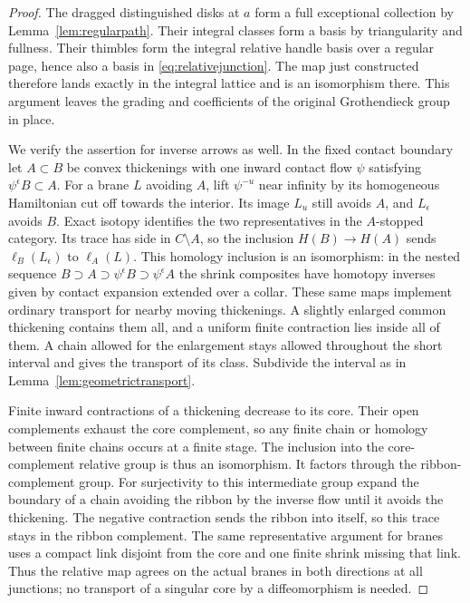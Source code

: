 \begin{proof}
The dragged distinguished disks at $a$ form a full exceptional collection by Lemma~\ref{lem:regularpath}. Their integral classes form a basis by triangularity and fullness. Their thimbles form the integral relative handle basis over a regular page, hence also a basis in \eqref{eq:relativejunction}. The map just constructed therefore lands exactly in the integral lattice and is an isomorphism there. This argument leaves the grading and coefficients of the original Grothendieck group in place.

We verify the assertion for inverse arrows as well. In the fixed contact boundary let $A\subset B$ be convex thickenings with one inward contact flow $\psi$ satisfying $\psi^\epsilon B\subset A$. For a brane $L$ avoiding $A$, lift $\psi^{-u}$ near infinity by its homogeneous Hamiltonian cut off towards the interior. Its image $L_u$ still avoids $A$, and $L_\epsilon$ avoids $B$. Exact isotopy identifies the two representatives in the $A$-stopped category. Its trace has side in $C\setminus A$, so the inclusion $H(B)\to H(A)$ sends $\ell_B(L_\epsilon)$ to $\ell_A(L)$. This homology inclusion is an isomorphism: in the nested sequence $B\supset A\supset\psi^\epsilon B\supset\psi^\epsilon A$ the shrink composites have homotopy inverses given by contact expansion extended over a collar. These same maps implement ordinary transport for nearby moving thickenings. A slightly enlarged common thickening contains them all, and a uniform finite contraction lies inside all of them. A chain allowed for the enlargement stays allowed throughout the short interval and gives the transport of its class. Subdivide the interval as in Lemma~\ref{lem:geometrictransport}.

Finite inward contractions of a thickening decrease to its core. Their open complements exhaust the core complement, so any finite chain or homology between finite chains occurs at a finite stage. The inclusion into the core-complement relative group is thus an isomorphism. It factors through the ribbon-complement group. For surjectivity to this intermediate group expand the boundary of a chain avoiding the ribbon by the inverse flow until it avoids the thickening. The negative contraction sends the ribbon into itself, so this trace stays in the ribbon complement. The same representative argument for branes uses a compact link disjoint from the core and one finite shrink missing that link. Thus the relative map agrees on the actual branes in both directions at all junctions; no transport of a singular core by a diffeomorphism is needed.
\end{proof}

